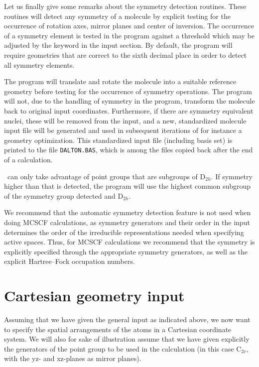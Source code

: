 Let us finally give some remarks about the symmetry
detection
routines. These routines will detect any symmetry of a molecule
by explicit testing for the occurrence of rotation axes, mirror planes
and center of inversion. The occurrence of a symmetry element is
tested in the program against a threshold which may be adjusted by the
keyword  in the  input section. By default,
the program will require
geometries that are correct to the sixth decimal place in order to
detect all symmetry elements.

The program will translate and rotate the molecule into a suitable
reference geometry before testing for the occurrence of symmetry
operations. The program will not, due to the handling of symmetry
in the program, transform  the molecule back to original input
coordinates. Furthermore, if there are symmetry equivalent nuclei,
these will be removed from the input, and a new, standardized
molecule input file will be generated and used in subsequent
iterations of for instance a geometry optimization. This
standardized input file (including basis set) is printed to the file
\verb|DALTON.BAS|, which is among the files copied back after the end
of a calculation.

\dalton\ can only take advantage of point groups that are subgroups
of D$_{2h}$. If symmetry higher than that is detected, the program
will use the highest common subgroup of  the symmetry group
detected and D$_{2h}$.

We recommend that the automatic symmetry detection feature is not
used when doing MCSCF calculations, as symmetry
generators and their order in the input
determines the order of the irreducible representations
needed when specifying active spaces. Thus, for MCSCF calculations
we recommend that the symmetry is  explicitly specified through
the appropriate symmetry generators, as well as the explicit
Hartree--Fock occupation numbers.

\section{Cartesian geometry input}\label{sec:molcart}

Assuming that we have given the general input as indicated above, we
now want to specify the spatial arrangements of the atoms in a
Cartesian coordinate system. We will also for sake of illustration
assume that we have given explicitly the generators of the point group
to be used in the calculation (in this case C$_{2v}$, with the yz- and
xz-planes as mirror planes).

